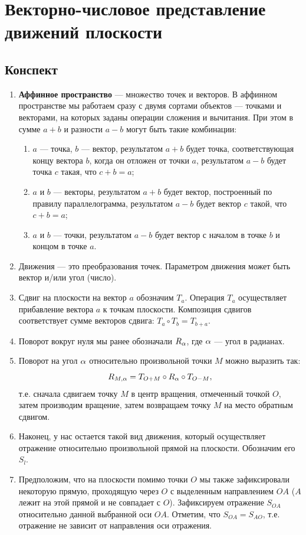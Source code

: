 \section{Векторно-числовое представление движений плоскости}

\subsection{Конспект}

\begin{enumerate}
\item \textbf{Аффинное пространство} --- множество точек и векторов. В аффинном пространстве мы работаем сразу с двумя сортами объектов --- точками и векторами, на которых заданы операции сложения и вычитания. При этом в сумме $a+b$ и разности $a-b$ могут быть такие комбинации:
\begin{enumerate}[1)]
\item $a$ --- точка, $b$ --- вектор, результатом $a+b$ будет точка, соответствующая концу вектора $b$, когда он отложен от точки $a$, результатом $a-b$ будет точка $c$ такая, что $c+b=a$;
\item $a$ и $b$ --- векторы, результатом $a+b$ будет вектор, построенный по правилу параллелограмма, результатом $a-b$ будет вектор $c$ такой, что $c+b=a$;
\item $a$ и $b$ --- точки, результатом $a-b$ будет вектор с началом в точке $b$ и концом в точке $a$.
\end{enumerate}
\item Движения --- это преобразования точек. Параметром движения может быть вектор и/или угол (число).
\item Сдвиг на плоскости на вектор $a$ обозначим $T_a$. Операция $T_a$ осуществляет прибавление вектора $a$ к точкам плоскости. Композиция сдвигов соответствует сумме векторов сдвига: $T_a\circ T_b=T_{b+a}$.
\item Поворот вокруг нуля мы ранее обозначали $R_\alpha$, где $\alpha$ --- угол в радианах.
\item Поворот на угол $\alpha$ относительно произвольной точки $M$ можно выразить так:
$$
R_{M,\alpha} = T_{O+M}\circ R_\alpha\circ T_{O-M},
$$
т.е. сначала сдвигаем точку $M$ в центр вращения, отмеченный точкой $O$, затем производим вращение, затем возвращаем точку $M$ на место обратным сдвигом.
\item Наконец, у нас остается такой вид движения, который осуществляет отражение относительно произвольной прямой на плоскости. Обозначим его $S_l$.
\item Предположим, что на плоскости помимо точки $O$ мы также зафиксировали некоторую прямую, проходящую через $O$ с выделенным направлением $OA$ ($A$ лежит на этой прямой и не совпадает с $O$). Зафиксируем отражение $S_{OA}$ относительно данной выбранной оси $OA$. Отметим, что $S_{OA}=S_{AO}$, т.е. отражение не зависит от направления оси отражения.

\end{enumerate}
